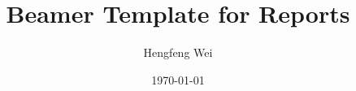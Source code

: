 \documentclass[]{beamer}
\title[]{Beamer Template for Reports}
\subtitle{\teal{(Conference VLDB'2022)}}
\author[Hengfeng Wei]{Hengfeng Wei}
\institute{hfwei@nju.edu.cn}
\date{\today}
\begin{document}
\maketitle

\thankyou{}
\end{document}
